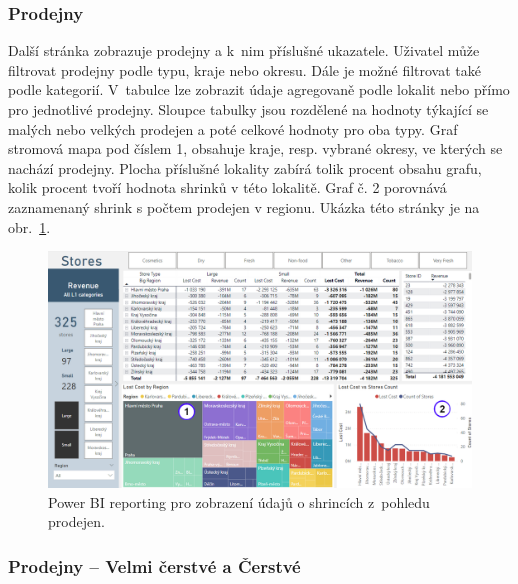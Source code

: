 \subsubsection*{Prodejny}

Další stránka zobrazuje prodejny a k~nim příslušné ukazatele. Uživatel může filtrovat prodejny podle typu, kraje nebo okresu. Dále je možné filtrovat také podle kategorií. V~tabulce lze zobrazit údaje agregovaně podle lokalit nebo přímo pro jednotlivé prodejny. Sloupce tabulky jsou rozdělené na hodnoty týkající se malých nebo velkých prodejen a poté celkové hodnoty pro oba typy. Graf stromová mapa pod číslem 1, obsahuje kraje, resp. vybrané okresy, ve kterých se nachází prodejny. Plocha příslušné lokality zabírá tolik procent obsahu grafu, kolik procent tvoří hodnota shrinků v této lokalitě. Graf č. 2 porovnává zaznamenaný shrink s počtem prodejen v regionu. 
Ukázka této stránky je na obr.~\ref*{obr:PBI:stores}.

\begin{figure}[h!]
    \centering
    \captionsetup{justification=centering}
    \includegraphics[width=\textwidth]{obrazky/PBI/storesall.png}
    \caption{Power BI reporting pro zobrazení údajů o shrincích z~pohledu prodejen.}
    \label{obr:PBI:stores}
\end{figure}

\subsubsection*{Prodejny -- Velmi čerstvé a Čerstvé}

